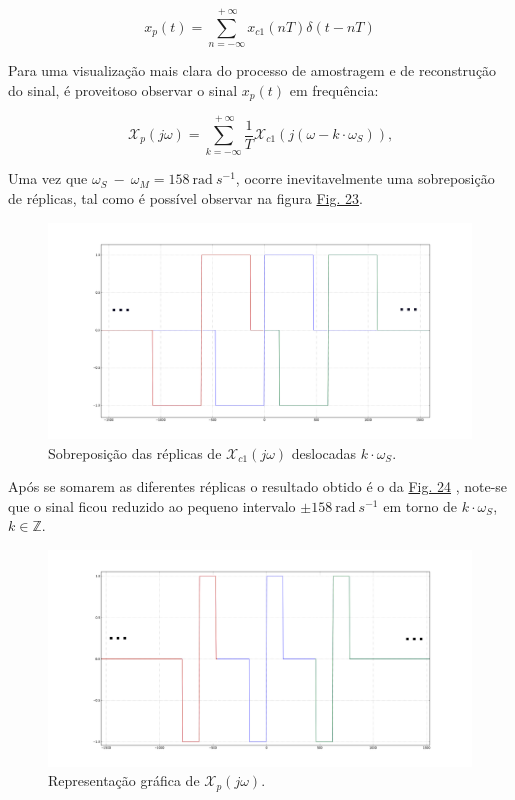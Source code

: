 \[x_p(t) = \sum \limits_{n = -\infty}^{\mbox{}+\infty} x_{c1}(nT) \delta (t - nT)\]


\clearpage

Para uma visualização mais clara do processo de amostragem e de reconstrução do sinal, é proveitoso observar o sinal \(x_p(t)\) em frequência:

\[\mathcal{X}_p(j\omega)=\sum \limits_{k = -\infty}^{\mbox{}+\infty} \frac{1}{T} \mathcal{X}_{c1}(j(\omega-k \cdot \omega_S))\text{,}\] 

Uma vez que \(\omega_S\ -\ \omega_M = 158\ \text{rad}\ s^{-1}\), ocorre inevitavelmente uma sobreposição de réplicas, tal como é possível observar na figura \hyperref[fig:XP_replicas]{Fig. 23}. 

\begin{figure}[ht]
    \centering
    \includegraphics[width = 0.5\linewidth]{prints/XP_replicas.png}   
    \caption{Sobreposição das réplicas de \(\mathcal{X}_{c1}(j\omega)\) deslocadas \(k \cdot \omega_S\).}
    \label{fig:XP_replicas}
\end{figure}

Após se somarem as diferentes réplicas o resultado obtido é o da \hyperref[fig:XP_soma]{Fig. 24} , note-se que o sinal ficou reduzido ao pequeno intervalo \(\pm 158\ \text{rad}\ s^{-1}\) em torno de \(k \cdot \omega_S\), \(k \in \mathbb{Z}\).

\begin{figure}[ht]
    \centering
    \includegraphics[width = 0.5\linewidth]{prints/XP_soma.png}   
    \caption{Representação gráfica de \(\mathcal{X}_p(j\omega)\).}
    \label{fig:XP_soma}
\end{figure}

